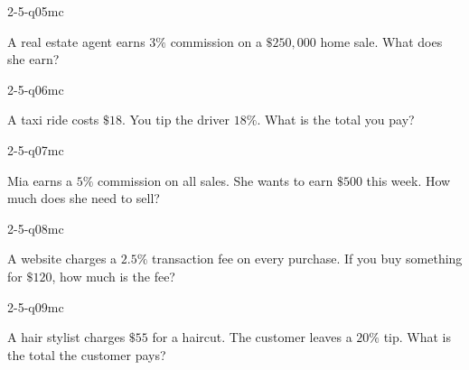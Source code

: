 \begin{practiceQuestion}{2-5-q05}{mc}
\begin{questionText}
A real estate agent earns $3\%$ commission on a $\$250{,}000$ home sale. What does she earn?
\end{questionText}
\end{practiceQuestion}

\begin{practiceQuestion}{2-5-q06}{mc}
\begin{questionText}
A taxi ride costs $\$18$. You tip the driver $18\%$. What is the total you pay?
\end{questionText}
\end{practiceQuestion}

\begin{practiceQuestion}{2-5-q07}{mc}
\begin{questionText}
Mia earns a $5\%$ commission on all sales. She wants to earn $\$500$ this week. How much does she need to sell?
\end{questionText}
\end{practiceQuestion}

\begin{practiceQuestion}{2-5-q08}{mc}
\begin{questionText}
A website charges a $2.5\%$ transaction fee on every purchase. If you buy something for $\$120$, how much is the fee?
\end{questionText}
\end{practiceQuestion}

\begin{practiceQuestion}{2-5-q09}{mc}
\begin{questionText}
A hair stylist charges $\$55$ for a haircut. The customer leaves a $20\%$ tip. What is the total the customer pays?
\end{questionText}
\end{practiceQuestion}

